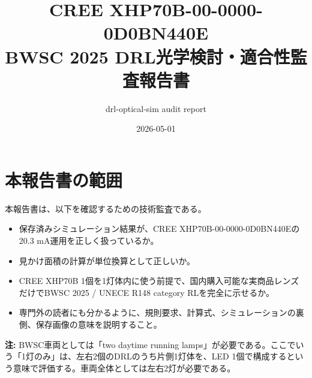 \documentclass[11pt,a4paper]{article}
\title{CREE XHP70B-00-0000-0D0BN440E\\BWSC 2025 DRL光学検討・適合性監査報告書}
\author{drl-optical-sim audit report}
\date{2026-05-01}
\newcommand{\note}[1]{\par\smallskip\noindent\textbf{注:} #1\par\smallskip}
\begin{document}
\maketitle

\begin{center}
\end{center}

\section{本報告書の範囲}
本報告書は、以下を確認するための技術監査である。

\begin{itemize}
\item 保存済みシミュレーション結果が、CREE XHP70B-00-0000-0D0BN440Eの20.3 mA運用を正しく扱っているか。
\item 見かけ面積の計算が単位換算として正しいか。
\item CREE XHP70B 1個を1灯体内に使う前提で、国内購入可能な実商品レンズだけでBWSC 2025 / UNECE R148 category RLを完全に示せるか。
\item 専門外の読者にも分かるように、規則要求、計算式、シミュレーションの裏側、保存画像の意味を説明すること。
\end{itemize}

\note{BWSC車両としては「two daytime running lamps」が必要である。ここでいう「1灯のみ」は、左右2個のDRLのうち片側1灯体を、LED 1個で構成するという意味で評価する。車両全体としては左右2灯が必要である。}
\end{document}
